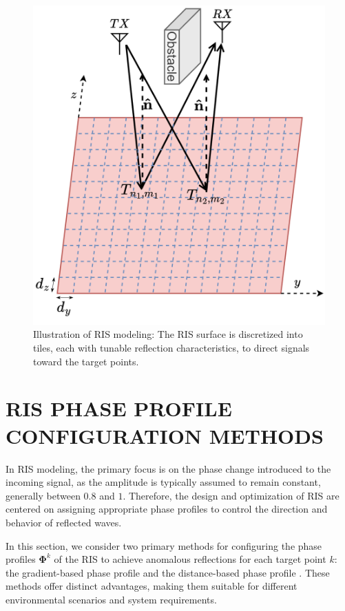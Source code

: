 \documentclass{IEEEoj}
\begin{document}
\begin{figure}
	\centering \includegraphics[width=.8\linewidth]{RIS_Modeling.png}
	\caption{Illustration of RIS modeling: The RIS surface is discretized into tiles, each with tunable reflection characteristics, to direct signals toward the target points.}
	\label{RIS_Modeling}
\end{figure}

\section{RIS PHASE PROFILE CONFIGURATION METHODS} \label{sec:phase_profile_section}
In RIS modeling, the primary focus is on the phase change introduced to the incoming signal, as the amplitude is typically assumed to remain constant, generally between $0.8$ and $1$. Therefore, the design and optimization of RIS are centered on assigning appropriate phase profiles to control the direction and behavior of reflected waves.

In this section, we consider two primary methods for configuring the phase profiles $\mathbf{\Phi}^k$ of the RIS to achieve anomalous reflections for each target point $k$: the gradient-based phase profile \cite{phase_grad_paper} and the distance-based phase profile \cite{Tang}. These methods offer distinct advantages, making them suitable for different environmental scenarios and system requirements.
\end{document}
